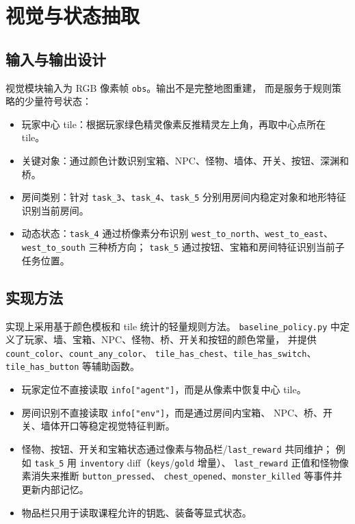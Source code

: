 \documentclass[12pt,a4paper]{ctexart}
\begin{document}
\section{视觉与状态抽取}

\subsection{输入与输出设计}

视觉模块输入为 RGB 像素帧 \texttt{obs}。输出不是完整地图重建，
而是服务于规则策略的少量符号状态：
\begin{itemize}[leftmargin=2em]
  \item 玩家中心 tile：根据玩家绿色精灵像素反推精灵左上角，再取中心点所在 tile。
  \item 关键对象：通过颜色计数识别宝箱、NPC、怪物、墙体、开关、按钮、深渊和桥。
  \item 房间类别：针对 \texttt{task\_3}、\texttt{task\_4}、\texttt{task\_5}
  分别用房间内稳定对象和地形特征识别当前房间。
  \item 动态状态：\texttt{task\_4} 通过桥像素分布识别
  \texttt{west\_to\_north}、\texttt{west\_to\_east}、
  \texttt{west\_to\_south} 三种桥方向；
  \texttt{task\_5} 通过按钮、宝箱和房间特征识别当前子任务位置。
\end{itemize}

\subsection{实现方法}

实现上采用基于颜色模板和 tile 统计的轻量规则方法。
\texttt{baseline\_policy.py} 中定义了玩家、墙、宝箱、NPC、怪物、桥、开关和按钮的颜色常量，
并提供 \texttt{count\_color}、\texttt{count\_any\_color}、
\texttt{tile\_has\_chest}、\texttt{tile\_has\_switch}、
\texttt{tile\_has\_button} 等辅助函数。
\begin{itemize}[leftmargin=2em]
  \item 玩家定位不直接读取 \texttt{info["agent"]}，而是从像素中恢复中心 tile。
  \item 房间识别不直接读取 \texttt{info["env"]}，而是通过房间内宝箱、
  NPC、桥、开关、墙体开口等稳定视觉特征判断。
  \item 怪物、按钮、开关和宝箱状态通过像素与物品栏/\texttt{last\_reward} 共同维护；
  例如 \texttt{task\_5} 用 \texttt{inventory} diff（\texttt{keys}/\texttt{gold} 增量）、
  \texttt{last\_reward} 正值和怪物像素消失来推断 \texttt{button\_pressed}、
  \texttt{chest\_opened}、\texttt{monster\_killed} 等事件并更新内部记忆。
  \item 物品栏只用于读取课程允许的钥匙、装备等显式状态。
\end{itemize}
\end{document}
